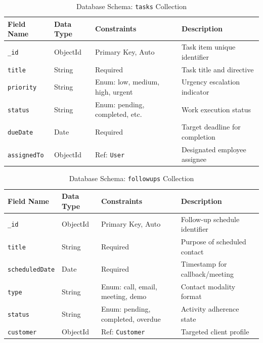 \begin{table}[h!]
\centering
\caption{Database Schema: \texttt{tasks} Collection}
\label{tab:schema_task}
\renewcommand{\arraystretch}{1.2}
\begin{tabular}{|p{3cm}|p{3cm}|p{3.5cm}|p{4.5cm}|}
\hline
\textbf{Field Name} & \textbf{Data Type} & \textbf{Constraints} & \textbf{Description} \\ \hline
\texttt{\_id} & ObjectId & Primary Key, Auto & Task item unique identifier \\ \hline
\texttt{title} & String & Required & Task title and directive \\ \hline
\texttt{priority} & String & Enum: low, medium, high, urgent & Urgency escalation indicator \\ \hline
\texttt{status} & String & Enum: pending, completed, etc. & Work execution status \\ \hline
\texttt{dueDate} & Date & Required & Target deadline for completion \\ \hline
\texttt{assignedTo} & ObjectId & Ref: \texttt{User} & Designated employee assignee \\ \hline
\end{tabular}
\end{table}

\begin{table}[h!]
\centering
\caption{Database Schema: \texttt{followups} Collection}
\label{tab:schema_followup}
\renewcommand{\arraystretch}{1.2}
\begin{tabular}{|p{3cm}|p{3cm}|p{3.5cm}|p{4.5cm}|}
\hline
\textbf{Field Name} & \textbf{Data Type} & \textbf{Constraints} & \textbf{Description} \\ \hline
\texttt{\_id} & ObjectId & Primary Key, Auto & Follow-up schedule identifier \\ \hline
\texttt{title} & String & Required & Purpose of scheduled contact \\ \hline
\texttt{scheduledDate}& Date & Required & Timestamp for callback/meeting \\ \hline
\texttt{type} & String & Enum: call, email, meeting, demo & Contact modality format \\ \hline
\texttt{status} & String & Enum: pending, completed, overdue & Activity adherence state \\ \hline
\texttt{customer} & ObjectId & Ref: \texttt{Customer} & Targeted client profile \\ \hline
\end{tabular}
\end{table}

